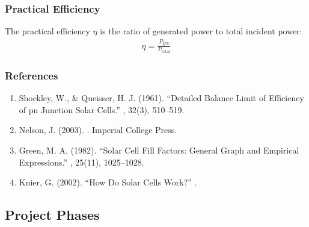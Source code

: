 \documentclass[letterpaper,10pt,english]{jupyterBook}
\begin{document}
\subsubsection{Practical Efficiency}
\label{\detokenize{ProjectInstructions:practical-efficiency}}
\sphinxAtStartPar
The practical efficiency \(\eta\) is the ratio of generated power to total
incident power:
\begin{equation*}
\begin{split}\eta = \frac{P_{\text{gen}}}{P_{\text{total}}}\end{split}
\end{equation*}

\subsubsection{References}
\label{\detokenize{ProjectInstructions:references}}\begin{enumerate}
%
\item {} 
\sphinxAtStartPar
Shockley, W., \& Queisser, H. J. (1961). “Detailed Balance Limit of
Efficiency of p\sphinxhyphen{}n Junction Solar Cells.” , 32(3), 510–519. 

\item {} 
\sphinxAtStartPar
Nelson, J. (2003). . Imperial College
Press.

\item {} 
\sphinxAtStartPar
Green, M. A. (1982). “Solar Cell Fill Factors: General Graph and
Empirical Expressions.” , 25(11),
1025–1028.

\item {} 
\sphinxAtStartPar
Knier, G. (2002). “How Do Solar Cells Work?” .

\end{enumerate}


\subsection{Project Phases}
\label{\detokenize{ProjectInstructions:project-phases}}
\end{document}
